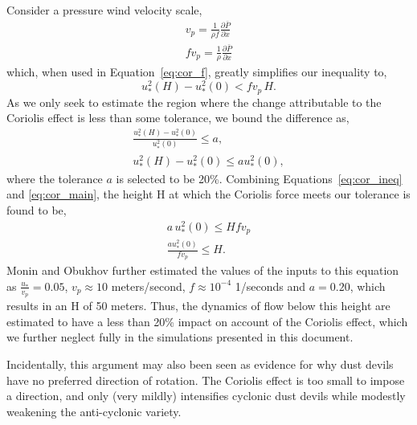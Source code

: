 Consider a pressure wind velocity scale, 
\begin{align}
 v_p = \frac{1}{\rho f} \frac{\partial \bar P}{\partial x}  \\
 f v_p = \frac{1}{\rho} \frac{\partial \bar P}{\partial x} 
\end{align}
which, when used in Equation~\ref{eq:cor_f}, greatly simplifies our
inequality to, 
\begin{equation}
u^2_*(H) - u^2_*(0)  < f v_p \, H. 
\label{eq:cor_main}
\end{equation}
As we only seek to estimate the region where the change attributable to
the Coriolis effect is less than some tolerance, we bound
the difference as,
\begin{align}
 \frac{u^2_*(H) - u^2_*(0)}{u^2_*(0)} \leq a, \\
 u^2_*(H) - u^2_*(0)\leq a u^2_*(0),
\label{eq:cor_ineq}
\end{align}
where the tolerance $a$ is selected to be 20\%. Combining
Equations~\ref{eq:cor_ineq} and \ref{eq:cor_main}, the height H at which
the Coriolis force meets our tolerance is found to be,
\begin{align}
 a \, u^2_*(0) \leq H f v_p \\
 \boxed{\frac{a u^2_*(0)}{f v_p} \leq H}.
\end{align}
Monin and Obukhov further estimated the values of the inputs to this
equation as $\frac{u_*}{v_p} = 0.05$, $v_p \approx 10$ meters/second, $f
\approx 10^{-4}$ 1/seconds and $a=0.20$, which results in an H of 50
meters. Thus, the dynamics of flow below this height are estimated to
have a less than 20\% impact on account of the Coriolis effect, which we
further neglect fully in the simulations presented in this document. 

Incidentally, this argument may also been seen as evidence for why dust
devils have no preferred direction of rotation. The Coriolis effect is
too small to impose a direction, and only (very mildly) intensifies
cyclonic dust devils while modestly weakening the anti-cyclonic variety.
